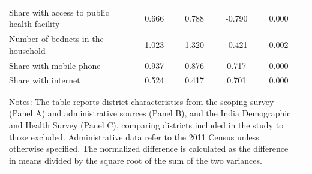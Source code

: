 {\begin{tabular}{lccccc}
Share with access to public health facility & 0.666 & 0.788 & -0.790 & 0.000 & \\
Number of bednets in the household & 1.023 & 1.320 & -0.421 & 0.002 & \\
Share with mobile phone & 0.937 & 0.876 & 0.717 & 0.000 & \\
Share with internet & 0.524 & 0.417 & 0.701 & 0.000 & \\
 \hline \hline \\[-5.1ex] &  &  &  &  & \\
\multicolumn{5}{p{.95\linewidth}}{\scriptsize Notes: The table reports district characteristics from the scoping survey (Panel A) and administrative sources (Panel B), and the India Demographic and Health Survey (Panel C), comparing districts included in the study to those excluded. Administrative data refer to the 2011 Census unless otherwise specified. The normalized difference is calculated as the difference in means divided by the square root of the sum of the two variances.}
\end{tabular}
}%
\\